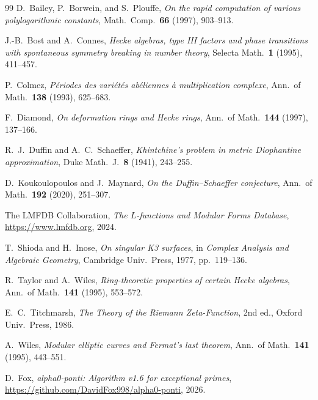 \documentclass[11pt,letterpaper]{article}
\theoremstyle{definition}
\begin{document}
\begin{thebibliography}{99}
D.~Bailey, P.~Borwein, and S.~Plouffe, \textit{On the rapid computation of various
polylogarithmic constants}, Math.\ Comp.\ \textbf{66} (1997), 903--913.

J.-B.~Bost and A.~Connes, \textit{Hecke algebras, type III factors and phase transitions
with spontaneous symmetry breaking in number theory}, Selecta Math.\ \textbf{1}
(1995), 411--457.

P.~Colmez, \textit{P\'eriodes des vari\'et\'es ab\'eliennes \`a multiplication complexe},
Ann.\ of Math.\ \textbf{138} (1993), 625--683.

F.~Diamond, \textit{On deformation rings and Hecke rings}, Ann.\ of Math.\ \textbf{144}
(1997), 137--166.

R.~J.~Duffin and A.~C.~Schaeffer, \textit{Khintchine's problem in metric Diophantine
approximation}, Duke Math.\ J.\ \textbf{8} (1941), 243--255.

D.~Koukoulopoulos and J.~Maynard, \textit{On the Duffin--Schaeffer conjecture},
Ann.\ of Math.\ \textbf{192} (2020), 251--307.

The LMFDB Collaboration, \textit{The $L$-functions and Modular Forms Database},
\url{https://www.lmfdb.org}, 2024.

T.~Shioda and H.~Inose, \textit{On singular K3 surfaces}, in \textit{Complex Analysis
and Algebraic Geometry}, Cambridge Univ.\ Press, 1977, pp.\ 119--136.

R.~Taylor and A.~Wiles, \textit{Ring-theoretic properties of certain Hecke algebras},
Ann.\ of Math.\ \textbf{141} (1995), 553--572.

E.~C.~Titchmarsh, \textit{The Theory of the Riemann Zeta-Function}, 2nd ed.,
Oxford Univ.\ Press, 1986.

A.~Wiles, \textit{Modular elliptic curves and Fermat's last theorem},
Ann.\ of Math.\ \textbf{141} (1995), 443--551.

D.~Fox, \textit{alpha0-ponti: Algorithm v1.6 for exceptional primes},
\url{https://github.com/DavidFox998/alpha0-ponti}, 2026.
\end{thebibliography}
\end{document}
